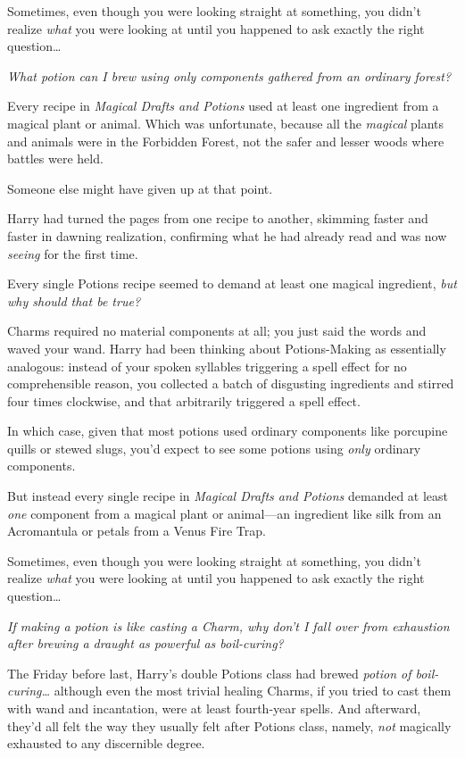 Sometimes, even though you were looking straight at something, you didn't
realize \emph{what} you were looking at until you happened to ask exactly the
right question{\ldots}

\emph{What potion can I brew using only components gathered from an ordinary
forest?}

Every recipe in \emph{Magical Drafts and Potions} used at least one ingredient
from a magical plant or animal. Which was unfortunate, because all the
\emph{magical} plants and animals were in the Forbidden Forest, not the safer
and lesser woods where battles were held.

Someone else might have given up at that point.

Harry had turned the pages from one recipe to another, skimming faster and
faster in dawning realization, confirming what he had already read and was now
\emph{seeing} for the first time.

Every single Potions recipe seemed to demand at least one magical ingredient,
\emph{but why should that be true?}

Charms required no material components at all; you just said the words and
waved your wand. Harry had been thinking about Potions-Making as essentially
analogous: instead of your spoken syllables triggering a spell effect for no
comprehensible reason, you collected a batch of disgusting ingredients and
stirred four times clockwise, and that arbitrarily triggered a spell effect.

In which case, given that most potions used ordinary components like porcupine
quills or stewed slugs, you'd expect to see some potions using \emph{only}
ordinary components.

But instead every single recipe in \emph{Magical Drafts and Potions} demanded
at least \emph{one} component from a magical plant or animal---an ingredient
like silk from an Acromantula or petals from a Venus Fire Trap.

Sometimes, even though you were looking straight at something, you didn't
realize \emph{what} you were looking at until you happened to ask exactly the
right question{\ldots}

\emph{If making a potion is like casting a Charm, why don't I fall over from
exhaustion after brewing a draught as powerful as boil-curing?}

The Friday before last, Harry's double Potions class had brewed \emph{potion of
boil-curing{\ldots}} although even the most trivial healing Charms, if you
tried to cast them with wand and incantation, were at least fourth-year spells.
And afterward, they'd all felt the way they usually felt after Potions class,
namely, \emph{not} magically exhausted to any discernible degree.


